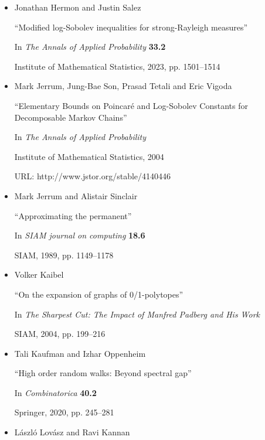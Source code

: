 \begin{itemize}
“Catalan Numbers, Their Generalization, and Their Uses”

In \emph{The Mathematical Intelligencer} \textbf{13}, 1991, pp. 64–75


      

\item[] [HS23]
Jonathan Hermon and Justin Salez

“Modified log-Sobolev inequalities for strong-Rayleigh measures”

In \emph{The Annals of Applied Probability} \textbf{33.2}

Institute of Mathematical Statistics, 2023, pp. 1501–1514


      

\item[] [Jer+04]
Mark Jerrum, Jung-Bae Son, Prasad Tetali and Eric Vigoda

“Elementary Bounds on Poincaré and Log-Sobolev Constants for Decomposable Markov Chains”

In \emph{The Annals of Applied Probability}

Institute of Mathematical Statistics, 2004

URL: http://www.jstor.org/stable/4140446


      

\item[] [JS89]
Mark Jerrum and Alistair Sinclair

“Approximating the permanent”

In \emph{SIAM journal on computing} \textbf{18.6}

SIAM, 1989, pp. 1149–1178


      

\item[] [Kai04]
Volker Kaibel

“On the expansion of graphs of 0/1-polytopes”

In \emph{The Sharpest Cut: The Impact of Manfred Padberg and His Work}

SIAM, 2004, pp. 199–216


      

\item[] [KO20]
Tali Kaufman and Izhar Oppenheim

“High order random walks: Beyond spectral gap”

In \emph{Combinatorica} \textbf{40.2}

Springer, 2020, pp. 245–281


      

\item[] [LK99]
László Lovász and Ravi Kannan


\end{itemize}
